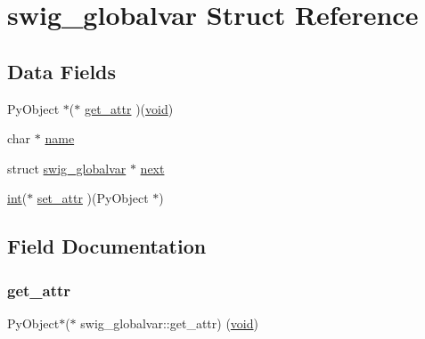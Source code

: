 \hypertarget{structswig__globalvar}{}\section{swig\+\_\+globalvar Struct Reference}
\label{structswig__globalvar}
\subsection*{Data Fields}
\begin{DoxyCompactItemize}
\item 
Py\+Object $\ast$($\ast$ \hyperlink{structswig__globalvar_ab617d0ca02f7660a9e5fd31dceaf6475}{get\+\_\+attr} )(\hyperlink{lp__lib_8h_ac7828c7b2b31d2e11af17bdb6289c5d9}{void})
\item 
char $\ast$ \hyperlink{structswig__globalvar_a32fcb5efb741f97e5c53e1a253cafdd9}{name}
\item 
struct \hyperlink{structswig__globalvar}{swig\+\_\+globalvar} $\ast$ \hyperlink{structswig__globalvar_a6b7f8fdec3a5c39a52b33c916d7ba028}{next}
\item 
\hyperlink{lp__lib_8h_adeb9ec6400320e4923ac9d836d509ddb}{int}($\ast$ \hyperlink{structswig__globalvar_acff619325c0e354df88508d64c1608e6}{set\+\_\+attr} )(Py\+Object $\ast$)
\end{DoxyCompactItemize}


\subsection{Field Documentation}
\mbox{\label{structswig__globalvar_ab617d0ca02f7660a9e5fd31dceaf6475}} 
\subsubsection{\texorpdfstring{get\+\_\+attr}{get\_attr}}
{\footnotesize\ttfamily Py\+Object$\ast$($\ast$ swig\+\_\+globalvar\+::get\+\_\+attr) (\hyperlink{lp__lib_8h_ac7828c7b2b31d2e11af17bdb6289c5d9}{void})}

\mbox{\label{structswig__globalvar_a32fcb5efb741f97e5c53e1a253cafdd9}} 

